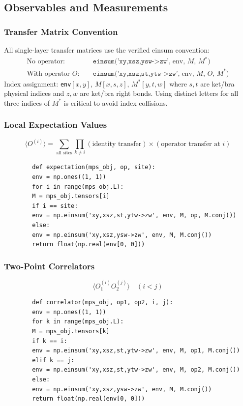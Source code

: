 \documentclass[aps,prb,onecolumn,scriptaddress]{revtex4-2}
\begin{document}
	\subsection{Observables and Measurements}
	
	\subsubsection{Transfer Matrix Convention}
	
	All single-layer transfer matrices use the verified einsum convention:
	\begin{align}
		\text{No operator:}&\quad
		\texttt{einsum('xy,xsz,ysw->zw',}\;\text{env},\,M,\,M^*\texttt{)}
		\label{eq:transfer_no_op}\\
		\text{With operator }O:&\quad
		\texttt{einsum('xy,xsz,st,ytw->zw',}\;\text{env},\,M,\,O,\,M^*\texttt{)}
		\label{eq:transfer_with_op}
	\end{align}
	Index assignment: \texttt{env}$[x,y]$, $M[x,s,z]$, $M^*[y,t,w]$
	where $s,t$ are ket/bra physical indices and $z,w$ are ket/bra right bonds.
	Using distinct letters for all three indices of $M^*$ is critical to avoid
	index collisions.
	
	\subsubsection{Local Expectation Values}
	
	\begin{equation}
		\langle O^{(i)} \rangle
		= \sum_{\text{all sites}} \prod_{k\neq i} (\text{identity transfer})
		\times (\text{operator transfer at }i)
	\end{equation}
	\begin{verbatim}
		def expectation(mps_obj, op, site):
		env = np.ones((1, 1))
		for i in range(mps_obj.L):
		M = mps_obj.tensors[i]
		if i == site:
		env = np.einsum('xy,xsz,st,ytw->zw', env, M, op, M.conj())
		else:
		env = np.einsum('xy,xsz,ysw->zw', env, M, M.conj())
		return float(np.real(env[0, 0]))
	\end{verbatim}
	
	\subsubsection{Two-Point Correlators}
	
	\begin{equation}
		\langle O^{(i)}_1 O^{(j)}_2 \rangle \quad (i < j)
	\end{equation}
	\begin{verbatim}
		def correlator(mps_obj, op1, op2, i, j):
		env = np.ones((1, 1))
		for k in range(mps_obj.L):
		M = mps_obj.tensors[k]
		if k == i:
		env = np.einsum('xy,xsz,st,ytw->zw', env, M, op1, M.conj())
		elif k == j:
		env = np.einsum('xy,xsz,st,ytw->zw', env, M, op2, M.conj())
		else:
		env = np.einsum('xy,xsz,ysw->zw', env, M, M.conj())
		return float(np.real(env[0, 0]))
	\end{verbatim}
	
\end{document}
